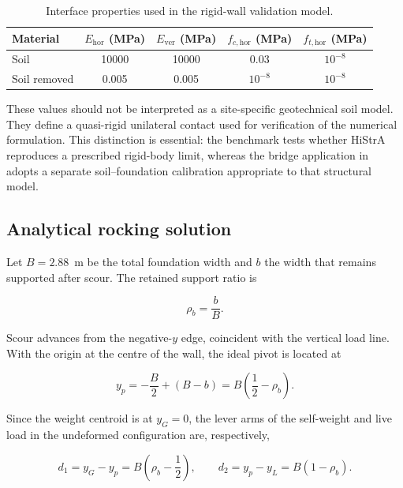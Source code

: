 \begin{table}[htbp]
\centering
\caption{Interface properties used in the rigid-wall validation model.}
\label{tab:wall-validation-contact-materials}
\begin{tabular}{lcccc}
\hline
Material & $E_{\mathrm{hor}}$ (MPa) & $E_{\mathrm{ver}}$ (MPa)
& $f_{c,\mathrm{hor}}$ (MPa) & $f_{t,\mathrm{hor}}$ (MPa)\\
\hline
Soil & 10000 & 10000 & 0.03 & $10^{-8}$\\
Soil removed & 0.005 & 0.005 & $10^{-8}$ & $10^{-8}$\\
\hline
\end{tabular}
\end{table}

These values should not be interpreted as a site-specific geotechnical soil
model. They define a quasi-rigid unilateral contact used for verification of
the numerical formulation. This distinction is essential: the benchmark
tests whether HiStrA reproduces a prescribed rigid-body limit, whereas the
bridge application in  adopts a separate
soil--foundation calibration appropriate to that structural model.

\subsection{Analytical rocking solution}
\label{sec:wall-validation-analytical}

Let $B=2.88$~m be the total foundation width and $b$ the width that remains
supported after scour. The retained support ratio is

\begin{equation}
\rho_b=\frac{b}{B}.
\label{eq:wall-validation-support-ratio}
\end{equation}

Scour advances from the negative-$y$ edge, coincident with the vertical load
line. With the origin at the centre of the wall, the ideal pivot is located at

\begin{equation}
y_p=-\frac{B}{2}+(B-b)=B\left(\frac{1}{2}-\rho_b\right).
\label{eq:wall-validation-pivot}
\end{equation}

Since the weight centroid is at $y_G=0$, the lever arms of the self-weight and
live load in the undeformed configuration are, respectively,

\begin{equation}
d_1=y_G-y_p=B\left(\rho_b-\frac{1}{2}\right),
\qquad
d_2=y_p-y_L=B(1-\rho_b).
\label{eq:wall-validation-arms}
\end{equation}

